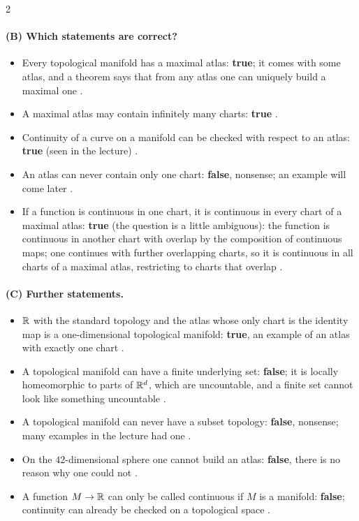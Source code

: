 \begin{paracol}{2}
\paragraph{(B) Which statements are correct?}
\begin{itemize}
  \item Every topological manifold has a maximal atlas: \textbf{true}; it comes with some atlas, and a theorem says that from any atlas one can uniquely build a maximal one .
  \item A maximal atlas may contain infinitely many charts: \textbf{true} .
  \item Continuity of a curve on a manifold can be checked with respect to an atlas: \textbf{true} (seen in the lecture) .
  \item An atlas can never contain only one chart: \textbf{false}, nonsense; an example will come later .
  \item If a function is continuous in one chart, it is continuous in every chart of a maximal atlas: \textbf{true} (the question is a little ambiguous): the function is continuous in another chart with overlap by the composition of continuous maps; one continues with further overlapping charts, so it
        is continuous in all charts of a maximal atlas, restricting to charts that overlap .
\end{itemize}

\paragraph{(C) Further statements.}
\begin{itemize}
  \item $\mathbb{R}$ with the standard topology and the atlas whose only chart is the identity map is a one-dimensional topological manifold: \textbf{true}, an example of an atlas with exactly one chart .
  \item A topological manifold can have a finite underlying set: \textbf{false}; it is locally homeomorphic to parts of $\mathbb{R}^d$, which are uncountable, and a finite set cannot look like something uncountable .
  \item A topological manifold can never have a subset topology: \textbf{false}, nonsense; many examples in the lecture had one .
  \item On the $42$-dimensional sphere one cannot build an atlas: \textbf{false}, there is no reason why one could not .
  \item A function $M\to\mathbb{R}$ can only be called continuous if $M$ is a manifold: \textbf{false}; continuity can already be checked on a topological space .
\end{itemize}


\end{paracol}
